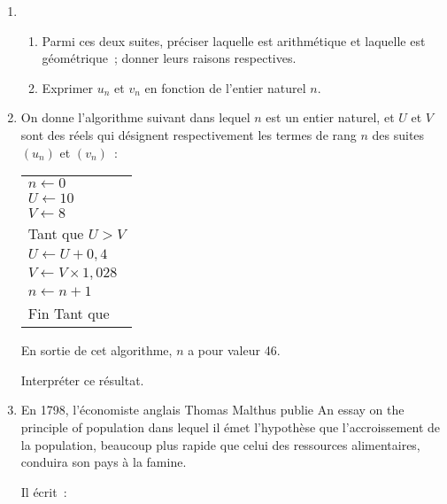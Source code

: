 \begin{enumerate}
     \item
     \begin{enumerate}[label=\alph*.]
          \item Parmi ces deux suites, préciser laquelle est arithmétique et laquelle est géométrique~; donner leurs raisons respectives.
          \item Exprimer $u_n$ et $v_n$ en fonction de l'entier naturel $n$.
     \end{enumerate}
     \item On donne l'algorithme suivant dans lequel $n$ est un entier naturel, et $U$ et $V$ sont des réels qui désignent respectivement les termes de rang $n$ des suites $\left(u_n\right)$ et $\left(v_n\right)$~:
     \begin{center}
          \begin{extern}%
               \begin{tabularx}{0.3\linewidth}{|X|}\hline
                    $n \gets 0$\\
                    $U \gets 10$\\
                    $V \gets 8$\\
                    Tant que $U > V$\\
                    \hspace{0.8cm}$U \gets U + 0,4$\\
                    \hspace{0.8cm}$V \gets  V \times 1,028$\\
                    \hspace{0.8cm}$n \gets n+1$\\
                    Fin Tant que\\ \hline
               \end{tabularx}
          \end{extern}
     \end{center}
     En sortie de cet algorithme, $n$ a pour valeur 46.
     \par
     Interpréter ce résultat.
     \item En 1798, l'économiste anglais Thomas Malthus publie \og An essay on the principle of population \fg{} dans lequel il émet l'hypothèse que l'accroissement de la population, beaucoup plus rapide que celui des ressources alimentaires, conduira son pays à la famine.
     \par
     Il écrit~:
     \begin{center}
\end{center}
\end{enumerate}
